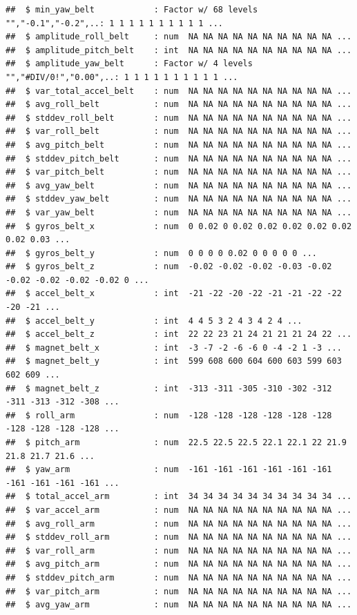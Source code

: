 \documentclass[]{article}
\begin{document}
\begin{verbatim}
##  $ min_yaw_belt            : Factor w/ 68 levels "","-0.1","-0.2",..: 1 1 1 1 1 1 1 1 1 1 ...
##  $ amplitude_roll_belt     : num  NA NA NA NA NA NA NA NA NA NA ...
##  $ amplitude_pitch_belt    : int  NA NA NA NA NA NA NA NA NA NA ...
##  $ amplitude_yaw_belt      : Factor w/ 4 levels "","#DIV/0!","0.00",..: 1 1 1 1 1 1 1 1 1 1 ...
##  $ var_total_accel_belt    : num  NA NA NA NA NA NA NA NA NA NA ...
##  $ avg_roll_belt           : num  NA NA NA NA NA NA NA NA NA NA ...
##  $ stddev_roll_belt        : num  NA NA NA NA NA NA NA NA NA NA ...
##  $ var_roll_belt           : num  NA NA NA NA NA NA NA NA NA NA ...
##  $ avg_pitch_belt          : num  NA NA NA NA NA NA NA NA NA NA ...
##  $ stddev_pitch_belt       : num  NA NA NA NA NA NA NA NA NA NA ...
##  $ var_pitch_belt          : num  NA NA NA NA NA NA NA NA NA NA ...
##  $ avg_yaw_belt            : num  NA NA NA NA NA NA NA NA NA NA ...
##  $ stddev_yaw_belt         : num  NA NA NA NA NA NA NA NA NA NA ...
##  $ var_yaw_belt            : num  NA NA NA NA NA NA NA NA NA NA ...
##  $ gyros_belt_x            : num  0 0.02 0 0.02 0.02 0.02 0.02 0.02 0.02 0.03 ...
##  $ gyros_belt_y            : num  0 0 0 0 0.02 0 0 0 0 0 ...
##  $ gyros_belt_z            : num  -0.02 -0.02 -0.02 -0.03 -0.02 -0.02 -0.02 -0.02 -0.02 0 ...
##  $ accel_belt_x            : int  -21 -22 -20 -22 -21 -21 -22 -22 -20 -21 ...
##  $ accel_belt_y            : int  4 4 5 3 2 4 3 4 2 4 ...
##  $ accel_belt_z            : int  22 22 23 21 24 21 21 21 24 22 ...
##  $ magnet_belt_x           : int  -3 -7 -2 -6 -6 0 -4 -2 1 -3 ...
##  $ magnet_belt_y           : int  599 608 600 604 600 603 599 603 602 609 ...
##  $ magnet_belt_z           : int  -313 -311 -305 -310 -302 -312 -311 -313 -312 -308 ...
##  $ roll_arm                : num  -128 -128 -128 -128 -128 -128 -128 -128 -128 -128 ...
##  $ pitch_arm               : num  22.5 22.5 22.5 22.1 22.1 22 21.9 21.8 21.7 21.6 ...
##  $ yaw_arm                 : num  -161 -161 -161 -161 -161 -161 -161 -161 -161 -161 ...
##  $ total_accel_arm         : int  34 34 34 34 34 34 34 34 34 34 ...
##  $ var_accel_arm           : num  NA NA NA NA NA NA NA NA NA NA ...
##  $ avg_roll_arm            : num  NA NA NA NA NA NA NA NA NA NA ...
##  $ stddev_roll_arm         : num  NA NA NA NA NA NA NA NA NA NA ...
##  $ var_roll_arm            : num  NA NA NA NA NA NA NA NA NA NA ...
##  $ avg_pitch_arm           : num  NA NA NA NA NA NA NA NA NA NA ...
##  $ stddev_pitch_arm        : num  NA NA NA NA NA NA NA NA NA NA ...
##  $ var_pitch_arm           : num  NA NA NA NA NA NA NA NA NA NA ...
##  $ avg_yaw_arm             : num  NA NA NA NA NA NA NA NA NA NA ...

\end{verbatim}
\end{document}
